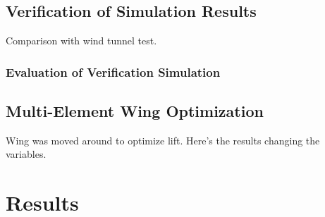  \subsection{Verification of Simulation Results}

  Comparison with wind tunnel test.

  \subsubsection{Evaluation of Verification Simulation}

  \subsection{Multi-Element Wing Optimization}
  Wing was moved around to optimize lift. Here's the results changing the variables.

\section{Results}
